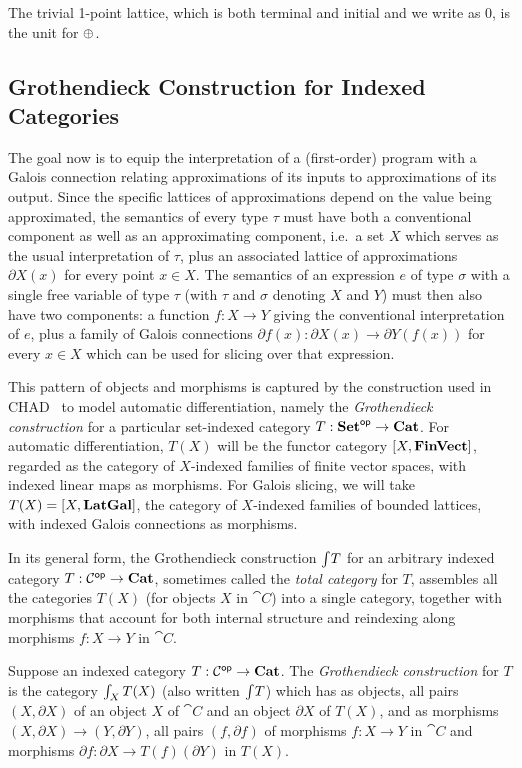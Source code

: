 \noindent The trivial 1-point lattice, which is both terminal and initial and we write as $0$, is the unit for
$\oplus$.

\subsection{Grothendieck Construction for Indexed Categories}
\label{sec:Grothendieck}

 The goal now is to equip the interpretation of a (first-order) program with a Galois connection
relating approximations of its inputs to approximations of its output. Since the specific lattices of
approximations depend on the value being approximated, the semantics of every type $\tau$ must have both a
conventional component as well as an approximating component, i.e.~a set $X$ which serves as the usual
interpretation of $\tau$, plus an associated lattice of approximations $\partial X(x)$ for every point $x \in
X$. The semantics of an expression $e$ of type $\sigma$ with a single free variable of type $\tau$ (with
$\tau$ and $\sigma$ denoting $X$ and $Y$) must then also have two components: a function $f: X \to Y$ giving
the conventional interpretation of $e$, plus a family of Galois connections $\partial f(x): \partial X(x) \to
\partial Y(f(x))$ for every $x \in X$ which can be used for slicing over that expression.

This pattern of objects and morphisms is captured by the construction used in CHAD~\cite{vákár22,nunes2023} to
model automatic differentiation, namely the \emph{Grothendieck construction} for a particular set-indexed
category $T: \mathbf{Set}^{\mathsf{op}} \to \mathbf{Cat}$. For automatic differentiation, $T(X)$ will be the functor category
$[X,\mathbf{FinVect}]$, regarded as the category of $X$-indexed families of finite vector spaces, with indexed
linear maps as morphisms. For Galois slicing, we will take $T(X) = [X,\mathbf{LatGal}]$, the category of
$X$-indexed families of bounded lattices, with indexed Galois connections as morphisms.

In its general form, the Grothendieck construction $\int_{}T$ for an arbitrary indexed category $T:
\mathcal{C}^{\mathsf{op}} \to \mathbf{Cat}$, sometimes called the \emph{total category} for $T$, assembles all the categories $T(X)$
(for objects $X$ in $\cat{C}$) into a single category, together with morphisms that account for both internal
structure and reindexing along morphisms $f: X \to Y$ in $\cat{C}$.

\begin{definition}
\label{def:Grothendieck}
Suppose an indexed category $T: \mathcal{C}^{\mathsf{op}} \to \mathbf{Cat}$. The \emph{Grothendieck construction} for $T$ is the
category $\int_{X}T(X)$ (also written $\int_{}T$) which has as objects, all pairs $(X,
\partial X)$ of an object $X$ of $\cat{C}$ and an object $\partial X$ of $T(X)$, and as morphisms $(X,
\partial X) \to (Y, \partial Y)$, all pairs $(f, \partial f)$ of morphisms $f: X \to Y$ in $\cat{C}$ and
morphisms $\partial f: \partial X \to T(f)(\partial Y)$ in $T(X)$.
\end{definition}

